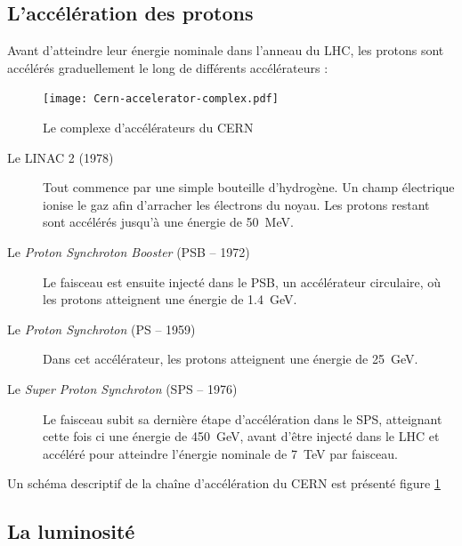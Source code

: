 \subsection{L'accélération des protons}
Avant d'atteindre leur énergie nominale dans l'anneau du LHC, les protons sont accélérés graduellement le long de différents accélérateurs :

\begin{figure} \centering
  \texttt{[image: Cern-accelerator-complex.pdf]}
  \caption{Le complexe d'accélérateurs du CERN}
  \label{fig:lhc_complex}
\end{figure}

\begin{description}
  \item[Le LINAC 2 (1978)] Tout commence par une simple bouteille d'hydrogène. Un champ électrique ionise le gaz afin d'arracher les électrons du noyau. Les protons restant sont accélérés jusqu'à une énergie de \SI{50}{\MeV}.
  \item[Le \emph{Proton Synchroton Booster} (PSB -- 1972)] Le faisceau est ensuite injecté dans le PSB, un accélérateur circulaire, où les protons atteignent une énergie de \SI{1.4}{\GeV}.
  \item[Le \emph{Proton Synchroton} (PS -- 1959)] Dans cet accélérateur, les protons atteignent une énergie de \SI{25}{GeV}.
  \item[Le \emph{Super Proton Synchroton} (SPS -- 1976)] Le faisceau subit sa dernière étape d'accélération dans le SPS, atteignant cette fois ci une énergie de \SI{450}{\GeV}, avant d'être injecté dans le LHC et accéléré pour atteindre l'énergie nominale de \SI{7}{\TeV} par faisceau.
\end{description}

Un schéma descriptif de la chaîne d'accélération du CERN est présenté figure \ref{fig:lhc_complex}

\subsection{La luminosité}

